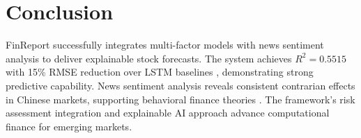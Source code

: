 \documentclass[3p,times,procedia]{elsarticle}
\begin{document}
\section{Conclusion}

FinReport successfully integrates multi-factor models \cite{FAMA1993,Carhart1997} with news sentiment analysis \cite{TETLOCK2007,Araci2019} to deliver explainable stock forecasts. The system achieves $R^2 = 0.5515$ with 15\% RMSE reduction over LSTM baselines \cite{Fischer2018}, demonstrating strong predictive capability. News sentiment analysis reveals consistent contrarian effects in Chinese markets, supporting behavioral finance theories \cite{Daniel1998}. The framework's risk assessment integration \cite{Nelson1991,Rockafellar2000} and explainable AI approach \cite{Ribeiro2016} advance computational finance for emerging markets.

\FloatBarrier
\vspace*{-3pt} 






\end{document}
